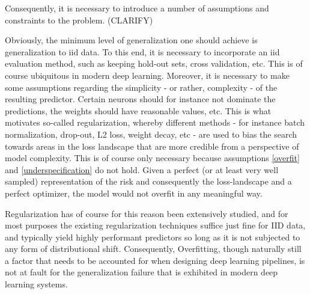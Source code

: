 		Consequently, it is necessary to introduce a number of assumptions and constraints to the problem. (CLARIFY)
		
		Obviously, the minimum level of generalization one should achieve is generalization to iid data. To this end, it is necessary to incorporate an iid evaluation method, such as keeping hold-out sets, cross validation, etc. This is of course ubiquitous in modern deep learning. Moreover, it is necessary to make some assumptions regarding the simplicity - or rather, complexity - of the resulting predictor. Certain neurons should for instance not dominate the predictions, the weights should have reasonable values, etc. This is what motivates so-called regularization, whereby different methods - for instance batch normalization, drop-out, L2 loss, weight decay, etc - are used to bias the search towards areas in the loss landscape that are more credible from a perspective of model complexity. This is of course only necessary because assumptions \ref{overfit} and \ref{underspecification} do not hold. Given a perfect (or at least very well sampled) representation of the risk and consequently the loss-landscape and a perfect optimizer, the model would not overfit in any meaningful way.  

		Regularization has of course for this reason been extensively studied, and for most purposes the existing regularization techniques suffice just fine for IID data, and typically yield highly performant predictors so long as it is not subjected to any form of distributional shift. Consequently, Overfitting, though naturally still a factor that needs to be accounted for when designing deep learning pipelines, is not at fault for the generalization failure that is exhibited in modern deep learning systems.

